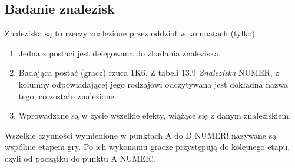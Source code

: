 \subsection{Badanie znalezisk}
Znaleziska są to rzeczy znalezione przez oddział w komnatach (tylko).
\begin{enumerate}
    \item
        Jedna z postaci jest delegowana do zbadania znaleziska.
    \item
        Badająca postać (gracz) rzuca 1K6.
        Z tabeli 13.9 \textit{Znaleziska} NUMER, z kolumny odpowiadającej jego rodzajowi odczytywana jest dokładna nazwa tego, co zostało znalezione.
    \item
        Wprowadzane są w życie wszelkie efekty, wiążące się z danym znaleziskiem.
\end{enumerate}
Wszelkie czynności wymienione w punktach A do D NUMER! nazywane są wspólnie etapem gry.
Po ich wykonaniu gracze przystępują do kolejnego etapu, czyli od początku do punktu A NUMER!.
